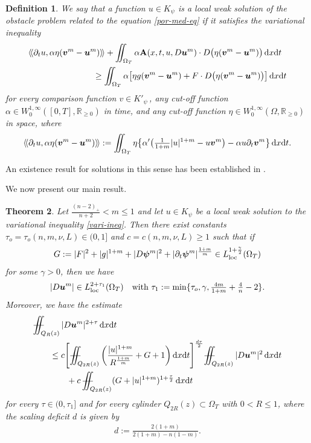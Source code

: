 \documentclass[a4paper, 10pt, american]{amsart}
\newtheorem{theorem}{Theorem}
\newtheorem{definition}[theorem]{Definition}
\numberwithin{theorem}{section}
\numberwithin{equation}{section}
\def\R{\mathbb{R}}
\newcommand{\A}[0]{\ensuremath{\mathbf{A}(x,t,u,D\power um)}}
\newcommand{\dxdt}{\,\mathrm{d}x\mathrm{d}t}
\newcommand{\power}[2]{\bm{#1^{\mbox{\unboldmath{\scriptsize$#2$}}}}}
\def\Xiint#1{\mathchoice
    {\XXiint\displaystyle\textstyle{#1}}%
    {\XXiint\textstyle\scriptstyle{#1}}%
    {\XXiint\scriptstyle\scriptscriptstyle{#1}}%
    {\XXiint\scriptscriptstyle\scriptscriptstyle{#1}}%
    \!\iint}
\def\XXiint#1#2#3{\setbox0=\hbox{$#1{#2#3}{\iint}$}
    \vcenter{\hbox{$#2#3$}}\kern-0.5\wd0}
\def\biint{\Xiint{-\!-}}
\begin{document}
\begin{definition}
  We say that a function $u\in K_\psi$ is a local weak solution of the
  obstacle problem related to the equation \eqref{por-med-eq} if it
  satisfies the variational inequality
  \begin{align}\label{vari-ineq}
    &\langle\!\langle\partial_tu,\alpha\eta(\power vm-\power um)\rangle\!\rangle
    +
    \iint_{\Omega_T}\alpha \A\cdot D\big(\eta(\power vm-\power um)\big)\dxdt \\\nonumber
    &\hspace{2.7cm}
    \ge \iint_{\Omega_T} \alpha \big[\eta g (\power vm-\power um)+F \cdot D\big(\eta(\power
    vm-\power um)\big) \big] \dxdt
  \end{align}
  for every comparison function $v\in K'_{\psi}$\,, any cut-off
  function $\alpha\in W^{1,\infty}_0([0,T],\R_{\ge0})$ in time, and
  any cut-off function $\eta\in W^{1,\infty}_0(\Omega,\R_{\ge0})$ in
  space, where
  \begin{equation}\label{weak-time-term}
    \langle\!\langle\partial_t u,\alpha\eta (\power vm-\power um)\rangle\!\rangle
    :=
    \iint_{\Omega_T} \eta \big\{ \alpha'\big(\tfrac1{1+m}|u|^{1+m}-u\power{v}{m}\big)
    -\alpha u\partial_t \power{v}{m} \big\}\dxdt.
  \end{equation}
\end{definition}

An existence result for solutions in this sense has been established
in \cite{BLS:MathAnn05}. 


We now present our main result.
\begin{theorem}\label{thm:main}
Let $\frac{(n-2)_+}{n+2}<m\le1$ and let $u\in K_\psi$ be a local weak
solution to the variational inequality \eqref{vari-ineq}.
Then there exist constants $\tau_o=\tau_o(n,m,\nu,L)\in(0,1]$ and $c=c(n,m,\nu,L)\ge1$ such that if
\begin{align}\label{def-G}
G:=|F|^2+|g|^{1+m}+|D\power\psi m|^2 + |\partial_t\power \psi m|^\frac{1+m}m \in L^{1+\frac\gamma2}_{\rm loc}(\Omega_T)
\end{align}
for some $\gamma>0$,
then we have
\begin{align*}
|D\power um|\in L^{2+\tau_1}_{\rm loc}(\Omega_T) 
\quad\mbox{with $\tau_1:=\min\{\tau_o,\gamma, \frac{4m}{1+m}+\frac4n-2\}$}.
\end{align*}
Moreover, we have the estimate
\begin{align}\label{desired-est-1}
&\biint_{Q_{R}(z)}|D\power um|^{2+\tau}\dxdt\nonumber\\
&\qquad\le
c\Bigg[ \biint_{Q_{2R}(z)} \bigg(\frac{|u|^{1+m}}{R^\frac{1+m}m}+G+1\bigg)\dxdt\Bigg]^\frac{d\tau }{2} \biint_{Q_{2R}(z)}|D\power um|^2\dxdt\nonumber\\
&\qquad\qquad+
c\,\biint_{Q_{2R}(z)}(G+|u|^{1+m})^{1+\frac\tau2}\dxdt
\end{align}
for every $\tau\in(0,\tau_1]$ and for every cylinder $Q_{2R}(z)\subset\Omega_T$ with $0<R\le1$,
where the scaling deficit $d$ is given by
\begin{align}\label{def-d}
d:=\frac{2(1+m)}{2(1+m)-n(1-m)}.
\end{align}
 \end{theorem}
\end{document}
